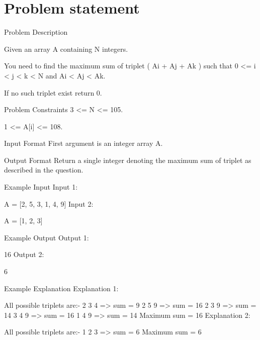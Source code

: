 \section{Problem statement}
\begin{exercise}
\label{example:max_triplet:exercice1}
Problem Description

Given an array A containing N integers.

You need to find the maximum sum of triplet ( Ai + Aj + Ak ) such that 0 <= i < j < k < N and Ai < Aj < Ak.

If no such triplet exist return 0.



Problem Constraints
3 <= N <= 105.

1 <= A[i] <= 108.



Input Format
First argument is an integer array A.



Output Format
Return a single integer denoting the maximum sum of triplet as described in the question.



Example Input
Input 1:

 A = [2, 5, 3, 1, 4, 9]
Input 2:

 A = [1, 2, 3]


Example Output
Output 1:

 16
Output 2:

 6


Example Explanation
Explanation 1:

 All possible triplets are:-
    2 3 4 => sum = 9
    2 5 9 => sum = 16
    2 3 9 => sum = 14
    3 4 9 => sum = 16
    1 4 9 => sum = 14
  Maximum sum = 16
Explanation 2:

 All possible triplets are:-
    1 2 3 => sum = 6
 Maximum sum = 6
	\begin{example}
		\label{example:max_triplet:example1}
		\hfill \
	}
		
	\end{example}

	\begin{example}
		\label{example:max_triplet:example2}
		\hfill \
		
	\end{example}

	\begin{example}
		\hfill \
	
	\label{ex:max_triplet:example1}
	\end{example}

	\begin{example}
		\hfill \

	\label{ex:max_triplet:example2}	
	\end{example}
\end{exercise}

